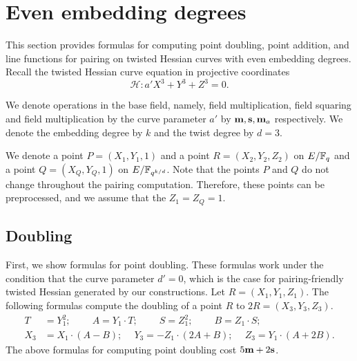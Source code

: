\section{Even embedding degrees}
\label{sec:even}

This section provides formulas for computing point doubling, point addition,
and line functions for pairing on twisted Hessian curves with even embedding degrees.
Recall the twisted Hessian curve equation in projective coordinates
$$ \mathcal{H}: a' X^3 + Y^3 + Z^3 = 0. $$

We denote operations in the base field, namely, 
field multiplication, field squaring and field multiplication by the curve parameter $a'$
by $\textbf{m}, \textbf{s}, \textbf{m}_{a}$ respectively.
We denote the embedding degree by $k$ and the twist degree by $d=3$.

We denote a point $P = (X_1,Y_1,1)$ and a point $R = (X_2,Y_2,Z_2)$ on $E/\mathbb{F}_{q}$
and a point $Q = (X_{Q},Y_{Q},1)$ on $E/\mathbb{F}_{q^{k/d}}$. %
Note that the points $P$ and $Q$ do not change throughout the pairing computation.
Therefore, these points can be preprocessed, and we assume that the $Z_1 = Z_{Q} = 1$.


\subsection{Doubling}
First, we show formulas for point doubling.
These formulas work under the condition that the curve parameter $d'=0$,
which is the case for pairing-friendly twisted Hessian generated by our constructions.
Let $R = (X_1, Y_1, Z_1)$.
The following formulas compute the doubling of a point $R$ to $2R = (X_3,Y_3,Z_3)$.
\begin{align*}
T &= Y_1^2;\	\qquad	A = Y_1 \cdot T;\	\qquad
S = Z_1 ^ 2;\	\qquad	B = Z_1 \cdot S;\\
X_3 &= X_1 \cdot (A - B);\	\quad
Y_3 = -Z_1 \cdot (2A + B);\	\quad
Z_3 = Y_1 \cdot (A + 2B).
\end{align*}
The above formulas for computing point doubling
cost $5\textbf{m} + 2\textbf{s}$. %

